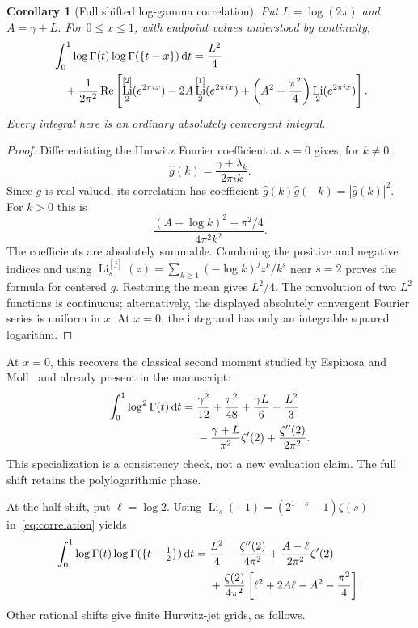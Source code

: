 \documentclass[11pt]{article}
\numberwithin{equation}{section}
\newtheorem{corollary}[theorem]{Corollary}
\theoremstyle{definition}
\theoremstyle{remark}
\DeclareMathOperator{\Li}{Li}
\DeclareMathOperator{\Rea}{Re}
\newcommand{\dd}{\,\mathrm d}
\begin{document}
\begin{corollary}[Full shifted log-gamma correlation]\label{cor:correlation}
Put $L=\log(2\pi)$ and $A=\gamma+L$. For $0\le x\le1$, with endpoint
values understood by continuity,
\begin{align}
 &\int_0^1\log\Gamma(t)\log\Gamma(\{t-x\})\dd t
   =\frac{L^2}{4}\label{eq:correlation}\\
 &\quad+\frac1{2\pi^2}\Rea\left[
     \Li_2^{[2]}(e^{2\pi ix})-2A\Li_2^{[1]}(e^{2\pi ix})
       +\left(A^2+\frac{\pi^2}{4}\right)\Li_2(e^{2\pi ix})\right].\notag
\end{align}
Every integral here is an ordinary absolutely convergent integral.
\end{corollary}
\begin{proof}
Differentiating the Hurwitz Fourier coefficient at $s=0$ gives, for
$k\ne0$,
\[
 \widehat g(k)=\frac{\gamma+\lambda_k}{2\pi i k}.
\]
Since $g$ is real-valued, its correlation has coefficient
$\widehat g(k)\widehat g(-k)=|\widehat g(k)|^2$. For $k>0$ this is
\[
 \frac{(A+\log k)^2+\pi^2/4}{4\pi^2k^2}.
\]
The coefficients are absolutely summable. Combining the positive and
negative indices and using
$\Li_s^{[j]}(z)=\sum_{k\ge1}(-\log k)^jz^k/k^s$ near $s=2$
proves the formula for centered $g$. Restoring the mean gives $L^2/4$.
The convolution of two $L^2$ functions is continuous; alternatively,
the displayed absolutely convergent Fourier series is uniform in $x$.
At $x=0$, the integrand has only an integrable squared logarithm.
\end{proof}

At $x=0$, this recovers the classical second moment studied by
Espinosa and Moll~\cite{EM1} and already present in the manuscript:
\begin{align}
 \int_0^1\log^2\Gamma(t)\dd t
 ={}&\frac{\gamma^2}{12}+\frac{\pi^2}{48}
      +\frac{\gamma L}{6}+\frac{L^2}{3}\label{eq:secondmoment}\\
 &-\frac{\gamma+L}{\pi^2}\zeta'(2)
      +\frac{\zeta''(2)}{2\pi^2}.\notag
\end{align}
This specialization is a consistency check, not a new evaluation claim.
The full shift retains the polylogarithmic phase.

At the half shift, put $\ell=\log2$. Using
$\Li_s(-1)=(2^{1-s}-1)\zeta(s)$ in~\eqref{eq:correlation} yields
\begin{align}
 \int_0^1\log\Gamma(t)\log\Gamma(\{t-\tfrac12\})\dd t
 ={}&\frac{L^2}4-\frac{\zeta''(2)}{4\pi^2}
       +\frac{A-\ell}{2\pi^2}\zeta'(2)\label{eq:halfcorr}\\
 &+\frac{\zeta(2)}{4\pi^2}
       \left[\ell^2+2A\ell-A^2-\frac{\pi^2}4\right].\notag
\end{align}
Other rational shifts give finite Hurwitz-jet grids, as follows.
\end{document}
